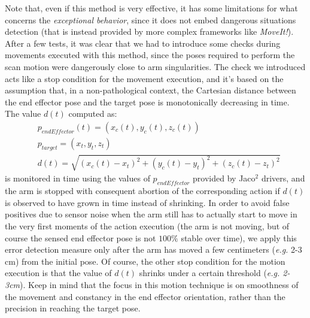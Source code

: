 Note that, even if this method is very effective, it has some limitations for what concerns the \textit{exceptional behavior}, since it does not embed dangerous situations detection (that is instead provided by more complex frameworks like \textit{MoveIt!}). After a few tests, it was clear that we had to introduce some checks during movements executed with this method, since the poses required to perform the scan motion were dangerously close to arm singularities. The check we introduced acts like a stop condition for the movement execution, and it's based on the assumption that, in a non-pathological context, the Cartesian distance between the end effector pose and the target pose is monotonically decreasing in time. The value $d(t)$ computed as:
\begin{align*}
	& p_{endEffector}(t) = (x_c(t),y_c(t),z_c(t)) \\
	& p_{target} = (x_t,y_t,z_t) \\
	& d(t)=\sqrt{(x_c(t)-x_t)^2+(y_c(t)-y_t)^2+(z_c(t)-z_t)^2}
\end{align*}
is monitored in time using the values of $p_{endEffector}$ provided by Jaco$^2$ drivers, and the arm is stopped with consequent abortion of the corresponding action if $d(t)$ is observed to have grown in time instead of shrinking. In order to avoid false positives due to sensor noise when the arm still has to actually start to move in the very first moments of the action execution (the arm is not moving, but of course the sensed end effector pose is not $100\%$ stable over time), we apply this error detection measure only after the arm has moved a few centimeters (\textit{e.g.} 2-3 cm) from the initial pose. Of course, the other stop condition for the motion execution is that the value of $d(t)$ shrinks under a certain threshold (\textit{e.g. 2-3cm}). Keep in mind that the focus in this motion technique is on smoothness of the movement and constancy in the end effector orientation, rather than the precision in reaching the target pose. 

